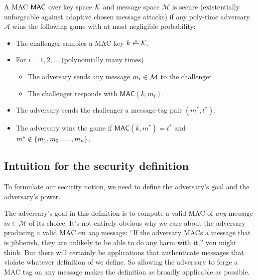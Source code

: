 \begin{definition}\label{def:mac-sec}
A MAC $\mathsf{MAC}$ over key space $\mathcal{K}$ and message space $\mathcal{M}$ is secure 
(existentially unforgeable against adaptive chosen
message attacks) if any poly-time adversary
$\mathcal{A}$ wins the following
game with at most negligible probability:
  \begin{itemize}[noitemsep]
    \item The challenger samples a MAC key $k \getsr \calK$.
    \item For $i = 1, 2, \dots$ (polynomially many times)
      \begin{itemize}
        \item The adversary sends any message $m_i \in \mathcal{M}$ 
              to the challenger 
        \item The challenger responds with $\mathsf{MAC}(k, m_i)$. 
      \end{itemize}
    \item The adversary sends the challenger a message-tag pair $(m^*, t^*)$.
    \item The adversary wins the game if $\mathsf{MAC}(k, m^*) = t^*$ and $m^* \notin \left\{ m_1, m_2, \ldots, m_n \right\}$.
  \end{itemize}

\end{definition}

\subsection{Intuition for the security definition}
To formulate our security notion, we need to define
the adversary's goal and the adversary's power.

The adversary's goal in this definition is 
to compute a valid MAC of \emph{any} message $m\in \mathcal{M}$
of its choice.
It's not entirely obvious why we care about the adversary producing 
a valid MAC on \textit{any} message: ``If the
adversary MACs a message that is jibberish, they
are unlikely to be able to do any harm with it,''
you might think. 
But there will certainly be applications
that authenticate messages that violate whatever
definition of  we define.
So allowing the adversary to forge a MAC tag on any 
message makes the definition as broadly applicable as possible.

